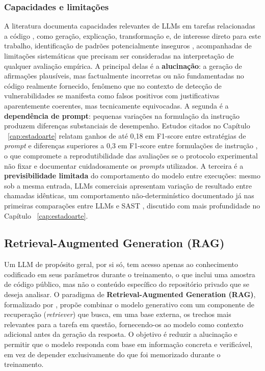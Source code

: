 \subsubsection{Capacidades e limitações}\label{subsubsec:llms-capacidades-limitacoes}
A literatura documenta capacidades relevantes de LLMs em tarefas relacionadas a código , como geração, explicação, transformação e, de interesse direto para este trabalho, identificação de padrões potencialmente inseguros , acompanhadas de limitações sistemáticas que precisam ser consideradas na interpretação de qualquer avaliação empírica. A principal delas é a \textbf{alucinação}: a geração de afirmações plausíveis, mas factualmente incorretas ou não fundamentadas no código realmente fornecido, fenômeno que no contexto de detecção de vulnerabilidades se manifesta como falsos positivos com justificativas aparentemente coerentes, mas tecnicamente equivocadas. A segunda é a \textbf{dependência de prompt}: pequenas variações na formulação da instrução produzem diferenças substanciais de desempenho. Estudos citados no Capítulo ~\ref{cap:estadoarte} relatam ganhos de até 0,18 em F1-score entre estratégias de \textit{prompt} \cite{Khare2025LLMEffectiveness} e diferenças superiores a 0,3 em F1-score entre formulações de instrução \cite{Iranmanesh2025ZeroFalse} , o que compromete a reprodutibilidade das avaliações se o protocolo experimental não fixar e documentar cuidadosamente os \textit{prompts} utilizados. A terceira é a \textbf{previsibilidade limitada} do comportamento do modelo entre execuções: mesmo sob a mesma entrada, LLMs comerciais apresentam variação de resultado entre chamadas idênticas, um comportamento não-determinístico documentado já nas primeiras comparações entre LLMs e SAST \cite{Ozturk2023AIvsSAST}, discutido com mais profundidade no Capítulo ~\ref{cap:estadoarte}.

\subsection{Retrieval-Augmented Generation (RAG)}\label{subsec:rag}
Um LLM de propósito geral, por si só, tem acesso apenas ao conhecimento codificado em seus parâmetros durante o treinamento, o que inclui uma amostra de código público, mas não o conteúdo específico do repositório privado que se deseja analisar. O paradigma de \textbf{Retrieval-Augmented Generation (RAG)}, formalizado por , propõe combinar o modelo generativo com um componente de recuperação (\textit{retriever}) que busca, em uma base externa, os trechos mais relevantes para a tarefa em questão, fornecendo-os ao modelo como contexto adicional antes da geração da resposta. O objetivo é reduzir a alucinação e permitir que o modelo responda com base em informação concreta e verificável, em vez de depender exclusivamente do que foi memorizado durante o treinamento.

